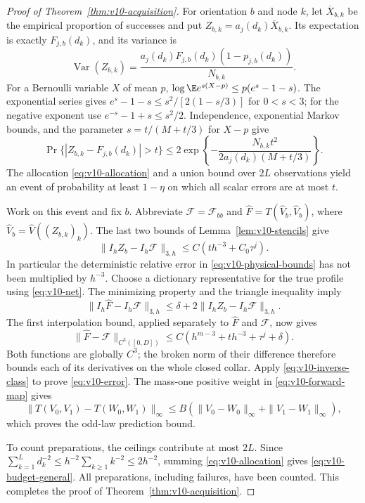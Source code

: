 \begin{proof}[Proof of Theorem~\ref{thm:v10-acquisition}]
For orientation $b$ and node $k$, let $\overline X_{b,k}$ be the
empirical proportion of successes and put
$Z_{b,k}=a_j(d_k)\overline X_{b,k}$. Its expectation is exactly
$F_{j,b}(d_k)$, and its variance is
\begin{equation}\label{eq:v10-variance}
 \operatorname{Var}(Z_{b,k})=
 \frac{a_j(d_k)F_{j,b}(d_k)(1-p_{j,b}(d_k))}{N_{b,k}}.
\end{equation}
For a Bernoulli variable $X$ of mean $p$,
$\log\E e^{s(X-p)}\le p(e^s-1-s)$.
The exponential series gives
$e^s-1-s\le s^2/[2(1-s/3)]$ for $0<s<3$; for the negative
exponent use $e^{-s}-1+s\le s^2/2$. Independence, exponential
Markov bounds, and the parameter $s=t/(M+t/3)$ for $X-p$ give
\begin{equation}\label{eq:v10-bernstein}
 \Pr\{|Z_{b,k}-F_{j,b}(d_k)|>t\}
 \le2\exp\left\{-\frac{N_{b,k}t^2}
            {2a_j(d_k)(M+t/3)}\right\}.
\end{equation}
The allocation \eqref{eq:v10-allocation} and a union bound over
$2L$ observations yield an event of probability at least $1-\eta$
on which all scalar errors are at most $t$.

Work on this event and fix $b$. Abbreviate $\mathcal F=\mathcal
F_{bb}$ and $\widehat F=T(\widehat V_b,\widehat V_b)$, where
$\widehat V_b=\widehat V((Z_{b,k})_k)$. The last two bounds of
Lemma~\ref{lem:v10-stencils} give
\begin{equation}\label{eq:v10-discrepancy}
 \|I_hZ_b-I_h\mathcal F\|_{3,h}
                    \le C(t h^{-3}+C_0\tau^j).
\end{equation}
In particular the deterministic relative error in
\eqref{eq:v10-physical-bounds} has not been multiplied by $h^{-3}$.
Choose a dictionary representative for the true profile using
\eqref{eq:v10-net}. The minimizing property and the triangle
inequality imply
\[
 \|I_h\widehat F-I_h\mathcal F\|_{3,h}
       \le \delta+2\|I_hZ_b-I_h\mathcal F\|_{3,h}.
\]
The first interpolation bound, applied separately to $\widehat F$
and $\mathcal F$, now gives
\[
 \|\widehat F-\mathcal F\|_{C^3([0,D])}
       \le C(h^{m-3}+t h^{-3}+\tau^j+\delta).
\]
Both functions are globally $C^3$; the broken norm of their difference
therefore bounds each of its derivatives on the whole closed collar.
Apply \eqref{eq:v10-inverse-class} to prove \eqref{eq:v10-error}.
The mass-one positive weight in \eqref{eq:v10-forward-map} gives
\[
 \|T(V_0,V_1)-T(W_0,W_1)\|_\infty
       \le B(\|V_0-W_0\|_\infty+\|V_1-W_1\|_\infty),
\]
which proves the odd-law prediction bound.

To count preparations, the ceilings contribute at most $2L$.
Since $\sum_{k=1}^L d_k^{-2}\le h^{-2}\sum_{k\ge1}k^{-2}
\le2h^{-2}$, summing \eqref{eq:v10-allocation} gives
\eqref{eq:v10-budget-general}. All preparations, including failures,
have been counted. This completes the proof of
Theorem~\ref{thm:v10-acquisition}.
\end{proof}

